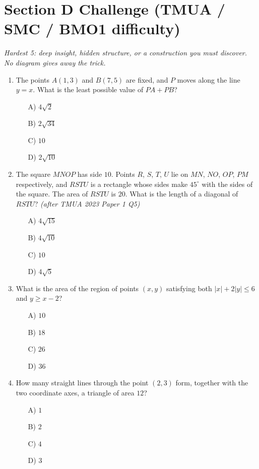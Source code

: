 \documentclass[11pt,a4paper]{article}
\begin{document}
\section*{Section D \quad Challenge \hfill{\normalfont\small(TMUA / SMC / BMO1 difficulty)}}

\noindent\textit{Hardest 5: deep insight, hidden structure, or a construction you must discover. No diagram gives away the trick.}

\begin{enumerate}

\item The points $A(1,3)$ and $B(7,5)$ are fixed, and $P$ moves along the line $y=x$. What is the least possible value of $PA+PB$?
\begin{itemize}
\item[A)] $4\sqrt2$
\item[B)] $2\sqrt{34}$
\item[C)] $10$
\item[D)] $2\sqrt{10}$
\end{itemize}

\item The square $MNOP$ has side $10$. Points $R$, $S$, $T$, $U$ lie on $MN$, $NO$, $OP$, $PM$ respectively, and $RSTU$ is a rectangle whose sides make $45^\circ$ with the sides of the square. The area of $RSTU$ is $20$. What is the length of a diagonal of $RSTU$? \textit{\small(after TMUA 2023 Paper 1 Q5)}
\begin{itemize}
\item[A)] $4\sqrt{15}$
\item[B)] $4\sqrt{10}$
\item[C)] $10$
\item[D)] $4\sqrt5$
\end{itemize}

\item What is the area of the region of points $(x,y)$ satisfying both $|x|+2|y|\le 6$ and $y\ge x-2$?
\begin{itemize}
\item[A)] $10$
\item[B)] $18$
\item[C)] $26$
\item[D)] $36$
\end{itemize}

\item How many straight lines through the point $(2,3)$ form, together with the two coordinate axes, a triangle of area $12$?
\begin{itemize}
\item[A)] $1$
\item[B)] $2$
\item[C)] $4$
\item[D)] $3$
\end{itemize}


\end{enumerate}
\end{document}
